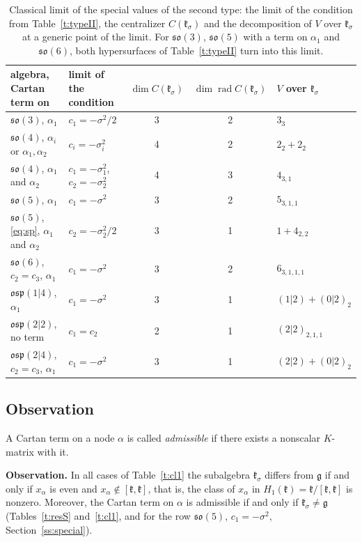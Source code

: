\documentclass[12pt,a4paper]{article}
\newcommand{\g}{\mathfrak{g}}
\newcommand{\kk}{\mathfrak{k}}
\newcommand{\so}{\mathfrak{so}}
\newcommand{\osp}{\mathfrak{osp}}
\begin{document}
\begin{table}[H]
\centering\small
\setlength{\tabcolsep}{4pt}
\begin{tabular}{@{}llccl@{}}
\toprule
algebra, Cartan term on & limit of the condition & $\dim C(\kk_\sigma)$ & $\dim\operatorname{rad}C(\kk_\sigma)$ & $V$ over $\kk_\sigma$\\
\midrule
$\so(3)$, $\alpha_1$ & $c_1=-\sigma^2/2$ & 3 & 2 & $3_{3}$\\
$\so(4)$, $\alpha_i$ or $\alpha_1,\alpha_2$ & $c_i=-\sigma_i^2$ & 4 & 2 & $2_{2}+2_{2}$\\
$\so(4)$, $\alpha_1$ and $\alpha_2$ & $c_1=-\sigma_1^2$, $c_2=-\sigma_2^2$ & 4 & 3 & $4_{3,1}$\\
$\so(5)$, $\alpha_1$ & $c_1=-\sigma^2$ & 3 & 2 & $5_{3,1,1}$\\
$\so(5)$, \eqref{eq:sp}, $\alpha_1$ and $\alpha_2$ & $c_2=-\sigma_2^2/2$ & 3 & 1 & $1+4_{2,2}$\\
$\so(6)$, $c_2=c_3$, $\alpha_1$ & $c_1=-\sigma^2$ & 3 & 2 & $6_{3,1,1,1}$\\
$\osp(1|4)$, $\alpha_1$ & $c_1=-\sigma^2$ & 3 & 1 & $(1|2)+(0|2)_{2}$\\
$\osp(2|2)$, no term & $c_1=c_2$ & 2 & 1 & $(2|2)_{2,1,1}$\\
$\osp(2|4)$, $c_2=c_3$, $\alpha_1$ & $c_1=-\sigma^2$ & 3 & 1 & $(2|2)+(0|2)_{2}$\\
\bottomrule
\end{tabular}
\caption{Classical limit of the special values of the second type: the limit of the condition from Table~\ref{t:typeII},
the centralizer $C(\kk_\sigma)$ and the decomposition of $V$ over $\kk_\sigma$ at a generic point of the limit. For $\so(3)$, $\so(5)$ with a term on $\alpha_1$ and
$\so(6)$, both hypersurfaces of Table~\ref{t:typeII} turn into this limit.}\label{t:cl3}
\end{table}



\subsection{Observation}\label{ss:hyp}
A Cartan term on a node $\alpha$ is called \emph{admissible} if there exists a nonscalar $K$-matrix with it.

\textbf{Observation.} In all cases of Table~\ref{t:cl1} the subalgebra $\kk_\sigma$ differs from $\g$ if and only
if $x_\alpha$ is even and $x_\alpha\notin[\kk,\kk]$, that is, the class of $x_\alpha$ in $H_1(\kk)=\kk/[\kk,\kk]$
is nonzero. Moreover, the Cartan term on $\alpha$ is admissible if and only if $\kk_\sigma\neq\g$
(Tables~\ref{t:resS} and~\ref{t:cl1}, and for the row $\so(5)$, $c_1=-\sigma^2$, Section~\ref{ss:special}).
\end{document}
